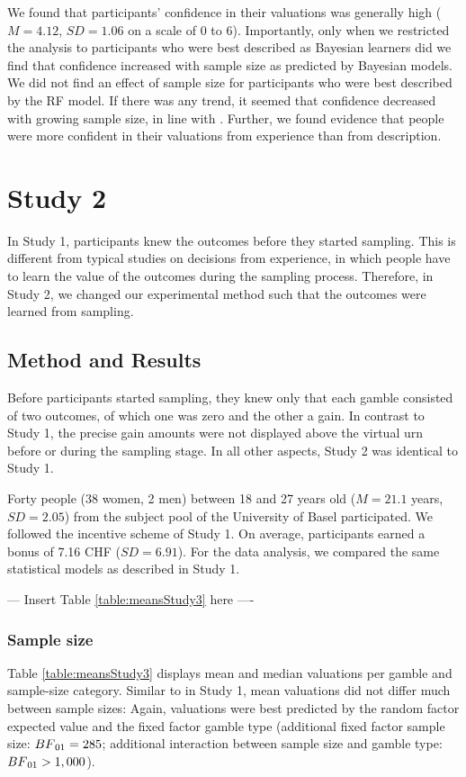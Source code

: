 \documentclass[a4paper,man, natbib]{apa6} %
\begin{document}
We found that participants' confidence in their valuations was generally high ($M = 4.12$, $SD = 1.06$ on a scale of 0 to 6). Importantly, only when we restricted the analysis to participants who were best described as Bayesian learners did we find that confidence increased with sample size as predicted by Bayesian models. We did not find an effect of sample size for participants who were best described by the RF model. If there was any trend, it seemed that confidence decreased with growing sample size, in line with \cite{Griffin1992}. Further, we found evidence that people were more confident in their valuations from experience than from description. 


\section{Study 2}
In Study 1, participants knew the outcomes before they started sampling. This is different from typical studies on decisions from experience, in which people have to learn the value of the outcomes during the sampling process. Therefore, in Study 2, we changed our experimental method such that the outcomes were learned from sampling.
\subsection{Method and Results}
Before participants started sampling, they knew only that each gamble consisted of two outcomes, of which one was zero and the other a gain. In contrast to Study 1, the precise gain amounts were not displayed above the virtual urn before or during the sampling stage. In all other aspects, Study 2 was identical to Study 1. 

Forty people (38 women, 2 men) between 18 and 27 years old ($M = 21.1$ years, $SD = 2.05$) from the subject pool of the University of Basel participated. We followed the incentive scheme of Study 1. On average, participants earned a bonus of 7.16 CHF ($SD = 6.91$). For the data analysis, we compared the same statistical models as described in Study 1.
\begin{center} --- Insert Table \ref{table:meansStudy3} here ---- \end{center}



\subsubsection{Sample size}
Table \ref{table:meansStudy3} displays mean and median valuations per gamble and sample-size category. Similar to in Study 1, mean valuations did not differ much between sample sizes: Again, valuations were best predicted by the random factor expected value and the fixed factor gamble type (additional fixed factor sample size: $BF\textsubscript{01} = 285$; additional interaction between sample size and gamble type: $BF\textsubscript{01} > 1,000 $). 
\end{document}
